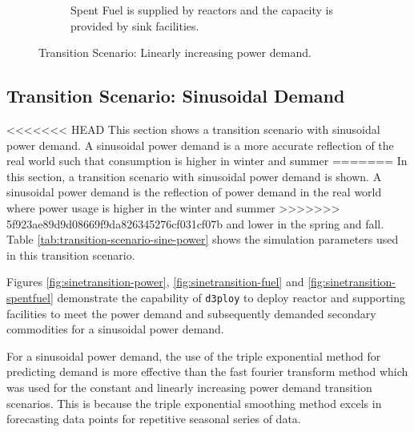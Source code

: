 \documentclass[11pt,letterpaper]{article}
\newcommand{\deploy}{\texttt{d3ploy}\xspace}%
\begin{document}
\begin{figure}[!htbp]
\begin{subfigure}[t]{0.65\textwidth}
        \caption{Spent Fuel is supplied by reactors and the capacity is provided by sink facilities.}
        \label{fig:growingtransition-spentfuel}
    \end{subfigure}
    \caption{Transition Scenario: Linearly increasing power demand.}
\end{figure}

\subsection{\textbf{Transition Scenario: Sinusoidal Demand}}
<<<<<<< HEAD
This section shows a transition scenario with sinusoidal
power demand. 
A sinusoidal power demand is a more accurate reflection of
the real world such that consumption is higher in winter and summer
=======
In this section, a transition scenario with sinusoidal
power demand is shown. 
A sinusoidal power demand is the reflection of power demand in 
the real world where power usage is higher in the winter and summer
>>>>>>> 5f923ae89d9d08669f9da826345276cf031cf07b
and lower in the spring and fall. 
Table \ref{tab:transition-scenario-sine-power} shows the 
simulation parameters used in this transition scenario. 

Figures \ref{fig:sinetransition-power}, \ref{fig:sinetransition-fuel}
and \ref{fig:sinetransition-spentfuel} demonstrate the capability 
of \deploy to deploy reactor and supporting facilities to meet the
power demand and subsequently demanded secondary commodities 
for a sinusoidal power demand. 

For a sinusoidal power demand, the use of the triple exponential method
for predicting demand is more effective than the 
fast fourier transform method which was used for the constant 
and linearly increasing power demand transition scenarios. 
This is because the triple exponential smoothing method excels in
forecasting data points for repetitive seasonal series of data.  
\end{document}
